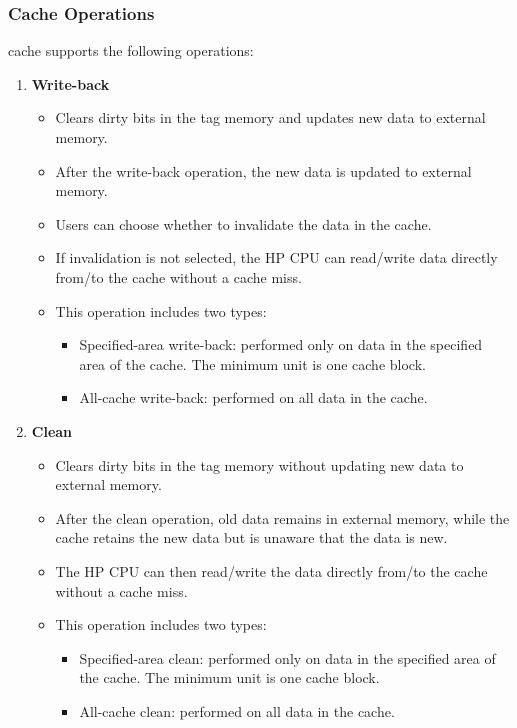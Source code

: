 \documentclass[main\_\_EN.tex]{subfiles}
\begin{document}
\subsubsection{Cache Operations}

\chipname{} cache supports the following operations:

\begin{enumerate}
\item \textbf{Write-back}
\begin{itemize}
    \item Clears dirty bits in the tag memory and updates new data to external memory.
    \item After the write-back operation, the new data is updated to external memory.
    \item Users can choose whether to invalidate the data in the cache.
    \item If invalidation is not selected, the HP CPU can read/write data directly from/to the cache without a cache miss.
    \item This operation includes two types:
    \begin{itemize}
    \item Specified-area write-back: performed only on data in the specified area of the cache. The minimum unit is one cache block.
    \item All-cache write-back: performed on all data in the cache.
    \end{itemize}
\end{itemize}

\item \textbf{Clean}
\begin{itemize}
    \item Clears dirty bits in the tag memory without updating new data to external memory.
    \item After the clean operation, old data remains in external memory, while the cache retains the new data but is unaware that the data is new.
    \item The HP CPU can then read/write the data directly from/to the cache without a cache miss.
    \item This operation includes two types:
    \begin{itemize}
    \item Specified-area clean: performed only on data in the specified area of the cache. The minimum unit is one cache block.
    \item All-cache clean: performed on all data in the cache.
    \end{itemize}
\end{itemize}


\end{enumerate}
\end{document}

